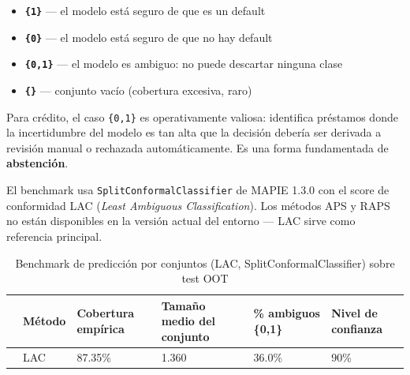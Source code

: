 \documentclass[
  spanish,
  11pt,
  letterpaper,
]{scrbook}
\providecommand{\tightlist}{%
  \setlength{\itemsep}{0pt}\setlength{\parskip}{0pt}}
\theoremstyle{plain}
\theoremstyle{remark}
\begin{document}
\begin{itemize}
\tightlist
\item
  \textbf{\texttt{\{1\}}} --- el modelo está seguro de que es un default
\item
  \textbf{\texttt{\{0\}}} --- el modelo está seguro de que no hay
  default
\item
  \textbf{\texttt{\{0,1\}}} --- el modelo es ambiguo: no puede descartar
  ninguna clase
\item
  \textbf{\texttt{\{\}}} --- conjunto vacío (cobertura excesiva, raro)
\end{itemize}

Para crédito, el caso \texttt{\{0,1\}} es operativamente valiosa:
identifica préstamos donde la incertidumbre del modelo es tan alta que
la decisión debería ser derivada a revisión manual o rechazada
automáticamente. Es una forma fundamentada de \textbf{abstención}.

El benchmark usa \texttt{SplitConformalClassifier} de MAPIE 1.3.0 con el
score de conformidad LAC (\emph{Least Ambiguous Classification}). Los
métodos APS y RAPS no están disponibles en la versión actual del entorno
--- LAC sirve como referencia principal.

{

\begin{longtable}[]{@{}llllll@{}}

\caption{\label{tbl-classification-sets}Benchmark de predicción por
conjuntos (LAC, SplitConformalClassifier) sobre test OOT}

\tabularnewline

\toprule\noalign{}
& Método & Cobertura empírica & Tamaño medio del conjunto & \% ambiguos
\{0,1\} & Nivel de confianza \\
\midrule\noalign{}
\endhead
\bottomrule\noalign{}
\endlastfoot
0 & LAC & 87.35\% & 1.360 & 36.0\% & 90\% \\

\end{longtable}

}
\end{document}
